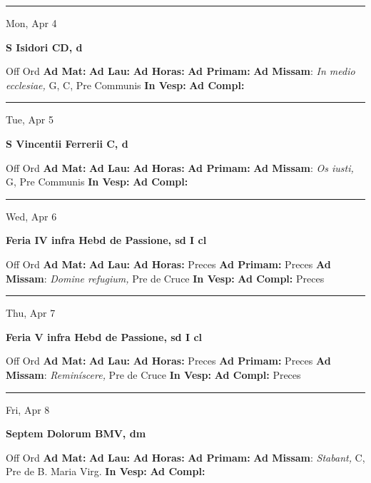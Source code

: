 \documentclass[letterpaper, 10pt]{article}
\begin{document}
\hrule
\begin{center}
Mon, Apr 4
\end{center}\textbf{ \large S Isidori CD, \textnormal{\normalsize d}}
\begin{justify}
Off Ord
\textbf{Ad Mat: }
\textbf{Ad Lau: }
\textbf{Ad Horas: }
\textbf{Ad Primam: }
\textbf{Ad Missam}: \textit{In medio ecclesiae,} G, C, Pre Communis
\textbf{In Vesp: }
\textbf{Ad Compl: }\end{justify}



\hrule
\begin{center}
Tue, Apr 5
\end{center}\textbf{ \large S Vincentii Ferrerii C, \textnormal{\normalsize d}}
\begin{justify}
Off Ord
\textbf{Ad Mat: }
\textbf{Ad Lau: }
\textbf{Ad Horas: }
\textbf{Ad Primam: }
\textbf{Ad Missam}: \textit{Os iusti,} G, Pre Communis
\textbf{In Vesp: }
\textbf{Ad Compl: }\end{justify}



\hrule
\begin{center}
Wed, Apr 6
\end{center}\textbf{ \large Feria IV infra Hebd de Passione, \textnormal{\normalsize sd I cl}}
\begin{justify}
Off Ord
\textbf{Ad Mat: }
\textbf{Ad Lau: }
\textbf{Ad Horas: }Preces
\textbf{Ad Primam: }Preces
\textbf{Ad Missam}: \textit{Domine refugium,} Pre de Cruce
\textbf{In Vesp: }
\textbf{Ad Compl: }Preces\end{justify}



\hrule
\begin{center}
Thu, Apr 7
\end{center}\textbf{ \large Feria V infra Hebd de Passione, \textnormal{\normalsize sd I cl}}
\begin{justify}
Off Ord
\textbf{Ad Mat: }
\textbf{Ad Lau: }
\textbf{Ad Horas: }Preces
\textbf{Ad Primam: }Preces
\textbf{Ad Missam}: \textit{Reminíscere,} Pre de Cruce
\textbf{In Vesp: }
\textbf{Ad Compl: }Preces\end{justify}



\hrule
\begin{center}
Fri, Apr 8
\end{center}\textbf{ \large Septem Dolorum BMV, \textnormal{\normalsize dm}}
\begin{justify}
Off Ord
\textbf{Ad Mat: }
\textbf{Ad Lau: }
\textbf{Ad Horas: }
\textbf{Ad Primam: }
\textbf{Ad Missam}: \textit{Stabant,} C, Pre de B. Maria Virg.
\textbf{In Vesp: }
\textbf{Ad Compl: }\end{justify}
\end{document}
